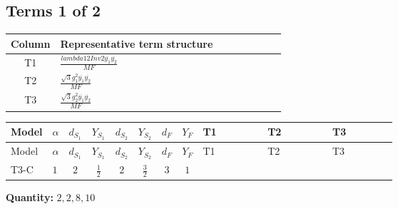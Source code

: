 \documentclass[8pt]{article}
\begin{document}
\begin{landscape}
\subsection*{Terms 1 of 2}
\begin{center}
\begin{tabular}{@{}c >{\raggedright\arraybackslash}p{0.82\linewidth}@{}}
\toprule
Column & Representative term structure \\
\midrule
T1 & \(\displaystyle \frac{lambda12Inv2 \overline{y_{1}} \overline{y_{2}}}{MF}\) \\
\midrule
T2 & \(\displaystyle \frac{\sqrt{3} g_{1}^{2} \overline{y_{1}} \overline{y_{2}}}{MF}\) \\
\midrule
T3 & \(\displaystyle \frac{\sqrt{3} g_{2}^{2} \overline{y_{1}} \overline{y_{2}}}{MF}\) \\
\midrule
\bottomrule
\end{tabular}
\end{center}
\smallskip
\tiny
\begin{longtable}{@{}llcccccc >{\raggedright\arraybackslash}p{0.21\linewidth} >{\raggedright\arraybackslash}p{0.21\linewidth} >{\raggedright\arraybackslash}p{0.21\linewidth}@{}}
\toprule
Model & $\alpha$ & $d_{S_1}$ & $Y_{S_1}$ & $d_{S_2}$ & $Y_{S_2}$ & $d_F$ & $Y_F$ & T1 & T2 & T3 \\
\midrule
\endfirsthead
\toprule
Model & $\alpha$ & $d_{S_1}$ & $Y_{S_1}$ & $d_{S_2}$ & $Y_{S_2}$ & $d_F$ & $Y_F$ & T1 & T2 & T3 \\
\midrule
\endhead
T3-C & $1$ & $2$ & $\frac{1}{2}$ & $2$ & $\frac{3}{2}$ & $3$ & $1$ & \scriptsize\adjustbox{max width=\linewidth}{$\begin{gathered} - \frac{lambda12Inv2 \overline{y_{1}} \overline{y_{2}}}{3 MF}\end{gathered}$} & \scriptsize\adjustbox{max width=\linewidth}{$\begin{gathered} - \frac{\sqrt{3} g_{1}^{2} \overline{y_{1}} \overline{y_{2}}}{2 MF}\end{gathered}$} & \scriptsize\adjustbox{max width=\linewidth}{$\begin{gathered} - \frac{\sqrt{3} g_{2}^{2} \overline{y_{1}} \overline{y_{2}}}{4 MF}\end{gathered}$} \\
\midrule
\bottomrule
\end{longtable}
\clearpage
\noindent\textbf{Quantity: }$\mathrm{2,2,8,10}$\par\smallskip

\end{landscape}
\end{document}
